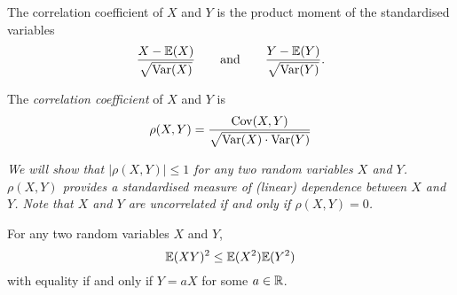 The correlation coefficient of $X$ and $Y$ is the product moment of the standardised variables 
\[
\displaystyle\frac{X-\mathbb{E}(X)}{\sqrt{\text{Var}(X)}} \qquad\text{and}\qquad \displaystyle\frac{Y-\mathbb{E}(Y)}{\sqrt{\text{Var}(Y)}}.
\]

\begin{definition}
The \emph{correlation coefficient} of $X$ and $Y$ is 
\[
\rho(X,Y) = \frac{\text{Cov}(X,Y)}{\sqrt{\text{Var}(X)\cdot\text{Var}(Y)}}
\]
\end{definition}

\begin{remark}
\bit
\it We will show that $|\rho(X,Y)|\leq 1$ for any two random variables $X$ and $Y$.
\it $\rho(X,Y)$ provides a \emph{standardised} measure of (linear) dependence between $X$ and $Y$.
\it Note that $X$ and $Y$ are uncorrelated if and only if $\rho(X,Y)=0$. 
\eit
\end{remark}
%
\begin{theorem}\label{thm:cauchyschwarz}
For any two random variables $X$ and $Y$, 
\[
\mathbb{E}(XY)^2\leq\mathbb{E}(X^2)\mathbb{E}(Y^2)
\]
with equality if and only if $Y=aX$ for some $a\in\mathbb{R}$.

\end{theorem}

